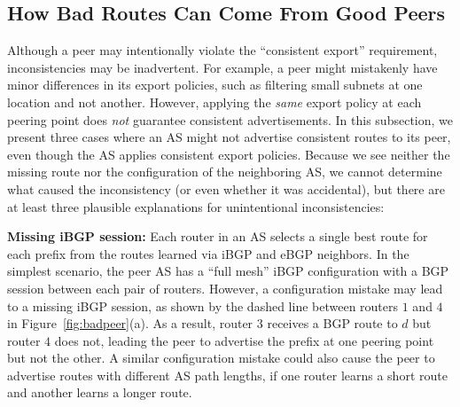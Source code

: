 

\begin{figure*}[t]
\centerline{}
\caption[Consistent export policies that can lead to inconsistent route export]{Peer AS configurations that lead to inconsistent route export, 
despite consistent export policy.  Router $3$ has a small intradomain
path cost to router $1$, and router $4$ has a small intradomain path
cost to router $2$.}
\label{fig:badpeer}
\end{figure*}

\subsection{How Bad Routes Can Come From Good Peers}
\label{sec:expl}
Although a peer may intentionally violate the ``consistent export''
requirement, inconsistencies may be inadvertent.  For example, a peer
might mistakenly have minor differences in its export policies, such as
filtering small subnets at one location and not another.  However,
applying the {\em same\/} export policy at each peering point does {\em
not\/} guarantee consistent advertisements.  In this subsection, we present
three cases where an AS might not advertise consistent routes to its
peer, even though the AS applies consistent export policies.  Because we
see neither the missing route nor the configuration of the neighboring
AS, we cannot determine what caused the inconsistency (or even whether
it was accidental), but there are at least three plausible explanations
for unintentional inconsistencies:

\noindent
{\bf Missing iBGP session:} Each router in an AS selects a
single best route for each prefix from the routes learned via iBGP and
eBGP neighbors.  In the simplest scenario, the peer AS has a ``full mesh''
iBGP configuration with a BGP session between each pair of routers.
However, a configuration mistake may lead to a missing iBGP session,
as shown by the dashed line between routers $1$ and $4$ in
Figure~\ref{fig:badpeer}(a).  As a result, router $3$ receives a BGP
route to $d$ but router $4$ does not, leading the peer to advertise
the prefix at one peering point but not the other.  
A similar configuration mistake could also cause the peer to advertise
routes with different AS path lengths, if one router learns a short
route and another learns a longer route.

